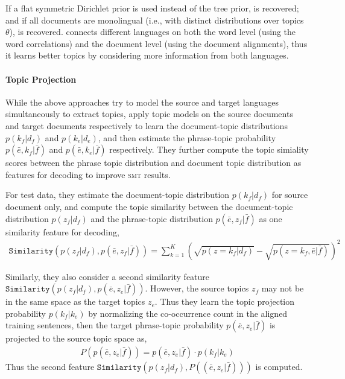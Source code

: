 If a flat symmetric Dirichlet prior is used instead of the tree prior, \plda{} is recovered; and if all documents are monolingual (i.e., with distinct distributions over topics $\theta$), \tlda{} is recovered. \ptlda{} connects different languages on both the word level (using the word correlations) and the document level (using the document alignments), thus it learns better topics by considering more information from both languages. 

\paragraph{\bf Topic Projection}

While the above approaches try to model the source and target languages simultaneously to extract topics, \citet{xiao-12} apply topic models on the source documents and target documents respectively to learn the document-topic distributions $p(k_f | d_f)$ and $p(k_e | d_e)$, and then estimate the phrase-topic probability $p(\bar{e}, k_f | \bar{f})$ and $p(\bar{e}, k_e | \bar{f})$ respectively. They further compute the topic simiality scores between the phrase topic distribution and document topic distribution as features for decoding to improve \textsc{smt} results.

For test data, they estimate the document-topic distribution $p(k_f | d_f)$ for source document only, and compute the topic similarity between the document-topic distribution $p(z_f|d_f)$ and the phrase-topic distribution $p(\bar{e}, z_f|\bar{f})$ as one similarity feature for decoding,
\begin{align}
\texttt{Similarity}(p(z_f|d_f), p(\bar{e}, z_f|\bar{f})) = \sum_{k=1}^{K} (\sqrt{p(z=k_f|d_f)} - \sqrt{p(z=k_f, \bar{e}|\bar{f})})^2
\end{align}

Similarly, they also consider a second similarity feature $\texttt{Similarity}(p(z_f|d_f), p(\bar{e}, z_e|\bar{f}))$. However, the source topics $z_f$ may not be in the same space as the target topics $z_e$. Thus they learn the topic projection probability $p(k_f | k_e)$ by normalizing the co-occurrence count in the aligned training sentences, then the target phrase-topic probability $p(\bar{e}, z_e|\bar{f})$ is projected to the source topic space as,
\begin{align}
P(p(\bar{e}, z_e|\bar{f})) = p(\bar{e}, z_e|\bar{f}) \cdot p(k_f | k_e)
\end{align}
Thus the second feature $\texttt{Similarity}(p(z_f|d_f), P((\bar{e}, z_e|\bar{f})))$ is computed. 

